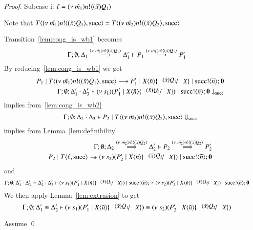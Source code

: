 \begin{proof}
	\noi Subcase i: $\ell = (\nu\ \tilde{m_1}) n ! \langle (\tilde{x}) Q_1 \rangle$

	\noi Note that $T\langle (\nu\ \tilde{m_1}) n ! \langle (\tilde{x}) Q_1 \rangle, \textrm{succ} \rangle = T\langle (\nu\ \tilde{m_2}) n ! \langle (\tilde{x}) Q_2 \rangle, \textrm{succ} \rangle$

	\noi Transition~\ref{lem:cong_is_wb1} becomes
	\begin{eqnarray}
		\Gamma; \emptyset; \Delta_1 \stackrel{(\nu\ \tilde{m_1}) n ! \langle (\tilde{x}) Q_1 \rangle}{\longrightarrow} \Delta_1' \vdash P_1 \stackrel{(\nu\ \tilde{m_1}) n ! \langle (\tilde{x}) Q_1 \rangle}{\longrightarrow} P_1'
		\label{lem:cong_is_wb3}
	\end{eqnarray}
	\noi By reducing~\ref{lem:cong_is_wb1} we get
	\begin{eqnarray*}
		&&P_1 \Par T\lrangle{\news{\tilde{m_1}} \bactout{n}{(\tilde{x}) Q_1}, \suc} \red P_1' \Par \appl{X}{\tilde{n}} \subst{(\tilde{x}) Q_1}{X} \Par \bout{\suc}{\dual{n}} \inact \\
		&&\Gamma; \es; \Delta_1' \cat \Delta_3' \proves \newsp{s_1}{P_1' \Par \appl{X}{\tilde{n}} \subst{(\tilde{x}) Q_1}{X}} \Par \bout{\suc}{\dual{n}} \inact \barb{\suc}
	\end{eqnarray*}
	\noi implies from~\ref{lem:cong_is_wb2}
	\begin{eqnarray*}
		&&\Gamma; \emptyset; \Delta_2 \cdot \Delta_3 \vdash P_2 \;|\; T\langle (\nu\ \tilde{m_2}) n ! \langle (\tilde{x}) Q_2 \rangle, \textrm{succ} \rangle \Downarrow_{\textrm{succ}}
	\end{eqnarray*}
	\noi implies from Lemma~\ref{lem:definibility}
	\begin{eqnarray}
		&&\Gamma; \es; \Delta_2 \By{\news{\tilde{m_2}} \bactout{n}{(\tilde{x}) Q_2}} \Delta_2' \proves P_2 \By{\news{\tilde{m_2}} \bactout{n}{(\tilde{x}) Q_2}} P_2'
		\label{lem:cong_is_wb4}\\
		&&P_2 \Par T \lrangle{\ell, \suc} \Red \newsp{s_2}{P_2' \Par \appl{X}{\tilde{n}} \subst{(\tilde{x}) Q_2}{X}} \Par \bout{\suc}{\dual{n}} \inact \nonumber
	\end{eqnarray}
	\noi and
	\[
		\Gamma; \es; \Delta_1' \cat \Delta_3' \cong \Delta_2' \cat \Delta_3' \proves \newsp{s_1}{P_1' \Par \appl{X}{\tilde{n}} \subst{(\tilde{x}) Q_1}{X}} \Par \bout{\suc}{\dual{n}} \cong \newsp{s_2}{P_2' \Par \appl{X}{\tilde{n}} \subst{(\tilde{x}) Q_2}{X}} \Par \bout{\suc}{\dual{n}} \inact
	\]
	We then apply Lemma~\ref{lem:extrusion} to get
	\[
		\Gamma; \es; \Delta_1' \cong \Delta_2' \proves \newsp{s_1}{P_1' \Par \appl{X}{\tilde{n}} \subst{(\tilde{x}) Q_1}{X}} \cong \newsp{s_2}{P_2' \Par \appl{X}{\tilde{n}} \subst{(\tilde{x}) Q_2}{X}}
	\]

	\noi Assume 
	\qed
\end{proof}

